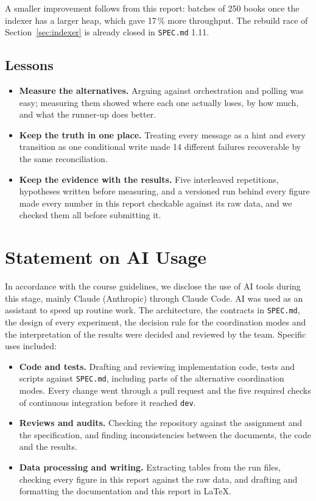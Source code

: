 \documentclass[11pt,a4paper]{article}
\newcommand{\code}[1]{\nolinkurl{#1}}
\begin{document}
A smaller improvement follows from this report: batches of 250 books once the indexer has a larger heap, which gave
17\,\% more throughput. The rebuild race of Section~\ref{sec:indexer} is already closed in \code{SPEC.md} 1.11.

\subsection{Lessons}

\begin{itemize}
\item \textbf{Measure the alternatives.} Arguing against orchestration and polling was easy; measuring them showed
  where each one actually loses, by how much, and what the runner-up does better.
\item \textbf{Keep the truth in one place.} Treating every message as a hint and every transition as one conditional
  write made 14 different failures recoverable by the same reconciliation.
\item \textbf{Keep the evidence with the results.} Five interleaved repetitions, hypotheses written before measuring,
  and a versioned run behind every figure made every number in this report checkable against its raw data, and we
  checked them all before submitting it.
\end{itemize}
\section{Statement on AI Usage}
\label{sec:ai}

In accordance with the course guidelines, we disclose the use of AI tools during this stage, mainly Claude
(Anthropic) through Claude Code. AI was used as an assistant to speed up routine work. The architecture, the contracts
in \code{SPEC.md}, the design of every experiment, the decision rule for the coordination modes and the interpretation
of the results were decided and reviewed by the team. Specific uses included:

\begin{itemize}
\item \textbf{Code and tests.} Drafting and reviewing implementation code, tests and scripts against \code{SPEC.md},
  including parts of the alternative coordination modes. Every change went through a pull request and the five
  required checks of continuous integration before it reached \code{dev}.
\item \textbf{Reviews and audits.} Checking the repository against the assignment and the specification, and finding
  inconsistencies between the documents, the code and the results.
\item \textbf{Data processing and writing.} Extracting tables from the run files, checking every figure in this report
  against the raw data, and drafting and formatting the documentation and this report in \LaTeX.
\end{itemize}
\end{document}
